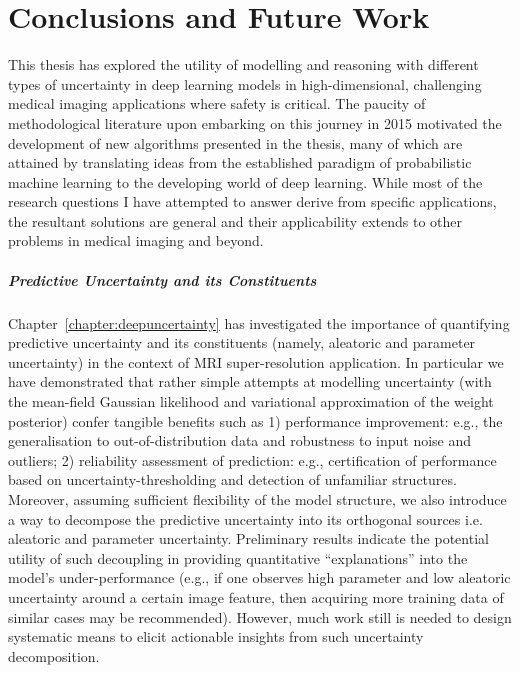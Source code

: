 \chapter{Conclusions and Future Work} \label{chapter:conclusions}

This thesis has explored the utility of modelling and reasoning with different types of uncertainty in deep learning models in high-dimensional, challenging medical imaging applications where safety is critical. The paucity of methodological literature upon embarking on this journey in 2015 motivated the development of new algorithms presented in the thesis, many of which are attained by translating ideas from the established paradigm of probabilistic machine learning to the developing world of deep learning. While most of the research questions I have attempted to answer derive from specific applications, the resultant solutions are general and their applicability extends to other problems in medical imaging and beyond. 

\paragraph{Predictive Uncertainty and its Constituents}
Chapter~\ref{chapter:deepuncertainty} has investigated the importance of quantifying predictive uncertainty and its constituents (namely, aleatoric and parameter uncertainty) in the context of MRI super-resolution application. In particular we have demonstrated that rather simple attempts at modelling uncertainty (with the mean-field Gaussian likelihood and variational approximation of the weight posterior) confer tangible benefits such as 1) performance improvement: e.g., the generalisation to out-of-distribution data and robustness to input noise and outliers; 2) reliability assessment of prediction: e.g., certification of performance based on uncertainty-thresholding and detection of unfamiliar structures. Moreover, assuming sufficient flexibility of the model structure, we also introduce a way to decompose the predictive uncertainty into its orthogonal sources i.e. aleatoric and parameter uncertainty. Preliminary results indicate the potential utility of such decoupling in providing quantitative ``explanations'' into the model's under-performance (e.g., if one observes high parameter and low aleatoric uncertainty around a certain image feature, then acquiring more training data of similar cases may be recommended). However, much work still is needed to design systematic means to elicit actionable insights from such uncertainty decomposition. 

